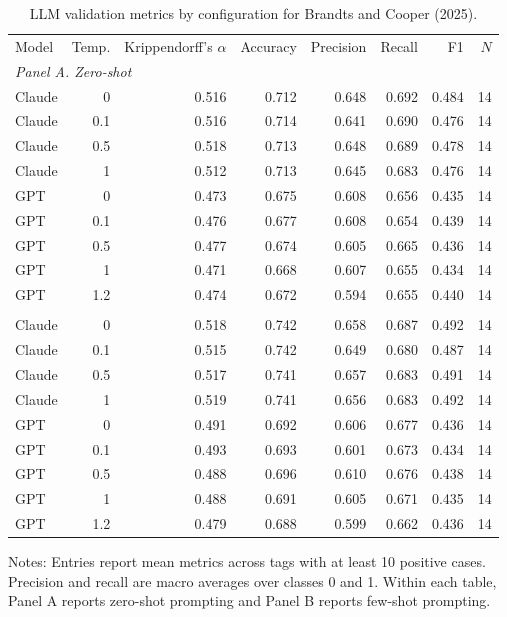 \begin{table}[htbp]
\centering
\caption{LLM validation metrics by configuration for Brandts and Cooper (2025).}
\label{tab:metrics_managerial_leadership_Jordi_Cooper}
\small
\begin{threeparttable}
\begin{tabular}{lrrrrrrr}
\toprule
Model & Temp. & Krippendorff's $\alpha$ & Accuracy & Precision & Recall & F1 & $N$
\\
\multicolumn{8}{l}{\textit{Panel A. Zero-shot}} \\
\midrule
Claude & 0 & 0.516 & 0.712 & 0.648 & 0.692 & 0.484 & 14 \\
Claude & 0.1 & 0.516 & 0.714 & 0.641 & 0.690 & 0.476 & 14 \\
Claude & 0.5 & 0.518 & 0.713 & 0.648 & 0.689 & 0.478 & 14 \\
Claude & 1 & 0.512 & 0.713 & 0.645 & 0.683 & 0.476 & 14 \\
GPT & 0 & 0.473 & 0.675 & 0.608 & 0.656 & 0.435 & 14 \\
GPT & 0.1 & 0.476 & 0.677 & 0.608 & 0.654 & 0.439 & 14 \\
GPT & 0.5 & 0.477 & 0.674 & 0.605 & 0.665 & 0.436 & 14 \\
GPT & 1 & 0.471 & 0.668 & 0.607 & 0.655 & 0.434 & 14 \\
GPT & 1.2 & 0.474 & 0.672 & 0.594 & 0.655 & 0.440 & 14 \\
\addlinespace[0.35em]
\multicolumn{8}{l}{\textit{Panel B. Few-shot}} \\
\midrule
Claude & 0 & 0.518 & 0.742 & 0.658 & 0.687 & 0.492 & 14 \\
Claude & 0.1 & 0.515 & 0.742 & 0.649 & 0.680 & 0.487 & 14 \\
Claude & 0.5 & 0.517 & 0.741 & 0.657 & 0.683 & 0.491 & 14 \\
Claude & 1 & 0.519 & 0.741 & 0.656 & 0.683 & 0.492 & 14 \\
GPT & 0 & 0.491 & 0.692 & 0.606 & 0.677 & 0.436 & 14 \\
GPT & 0.1 & 0.493 & 0.693 & 0.601 & 0.673 & 0.434 & 14 \\
GPT & 0.5 & 0.488 & 0.696 & 0.610 & 0.676 & 0.438 & 14 \\
GPT & 1 & 0.488 & 0.691 & 0.605 & 0.671 & 0.435 & 14 \\
GPT & 1.2 & 0.479 & 0.688 & 0.599 & 0.662 & 0.436 & 14 \\
\bottomrule
\end{tabular}
\begin{tablenotes}[flushleft]
\footnotesize Notes: Entries report mean metrics across tags with at least 10 positive cases. Precision and recall are macro averages over classes 0 and 1. Within each table, Panel A reports zero-shot prompting and Panel B reports few-shot prompting.
\end{tablenotes}
\end{threeparttable}
\end{table}
